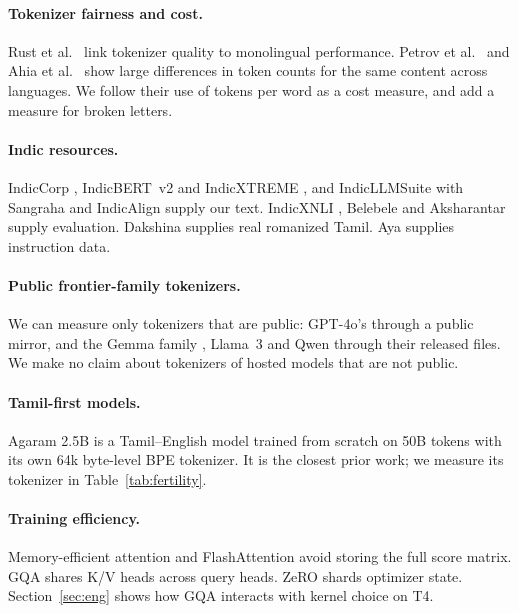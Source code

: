\documentclass[11pt]{article}
\begin{document}
\paragraph{Tokenizer fairness and cost.}
Rust et al.\ \cite{rust2021good} link tokenizer quality to monolingual performance. Petrov et al.\ \cite{petrov2023unfair} and Ahia et al.\ \cite{ahia2023cost} show large differences in token counts for the same content across languages. We follow their use of tokens per word as a cost measure, and add a measure for broken letters.

\paragraph{Indic resources.}
IndicCorp \cite{kakwani2020indicnlpsuite}, IndicBERT~v2 and IndicXTREME \cite{doddapaneni2023indicxtreme}, and IndicLLMSuite with Sangraha and IndicAlign \cite{khan2024indicllmsuite} supply our text. IndicXNLI \cite{aggarwal2022indicxnli}, Belebele \cite{bandarkar2024belebele} and Aksharantar \cite{madhani2022aksharantar} supply evaluation. Dakshina \cite{roark2020dakshina} supplies real romanized Tamil. Aya \cite{singh2024aya} supplies instruction data.

\paragraph{Public frontier-family tokenizers.}
We can measure only tokenizers that are public: GPT-4o's \cite{gpt4o} through a public mirror, and the Gemma family \cite{gemma2,gemma3}, Llama~3 \cite{llama3} and Qwen \cite{qwen3} through their released files. We make no claim about tokenizers of hosted models that are not public.

\paragraph{Tamil-first models.} Agaram 2.5B \citep{agaram2026} is a Tamil--English model trained from scratch on 50B tokens with its own 64k byte-level BPE tokenizer. It is the closest prior work; we measure its tokenizer in Table~\ref{tab:fertility}.

\paragraph{Training efficiency.}
Memory-efficient attention \cite{rabe2021selfattention} and FlashAttention \cite{dao2022flashattention} avoid storing the full score matrix. GQA \cite{ainslie2023gqa} shares K/V heads across query heads. ZeRO \cite{rajbhandari2020zero} shards optimizer state. Section~\ref{sec:eng} shows how GQA interacts with kernel choice on T4.
\end{document}
